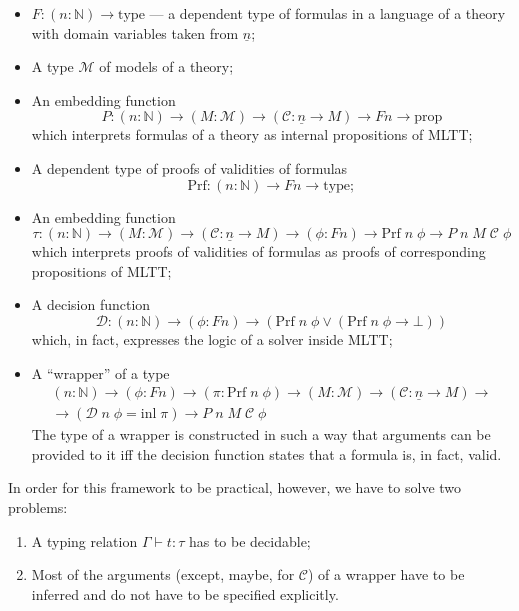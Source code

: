 \documentclass[manuscript,screen,review]{acmart}
\begin{document}
\begin{itemize}
  \item $F : (n : \mathbb{N}) \to \mathrm{type}$ --- a dependent type of
    formulas in a language of a theory with domain variables taken from
    $\underline{n}$;
  \item A type $\mathcal{M}$ of models of a theory;
  \item An embedding function
    \[
      P : (n : \mathbb{N}) \to (M : \mathcal{M})
          \to (\mathcal{C} : \underline{n} \to M) \to F n \to \mathrm{prop}
    \]
    which interprets formulas of a theory as internal propositions of MLTT;
  \item A dependent type of proofs of validities of formulas
    \[
      \mathrm{Prf} : (n : \mathbb{N}) \to F n \to \mathrm{type};
    \]
  \item An embedding function
    \[
      \tau : (n : \mathbb{N}) \to (M : \mathcal{M})
          \to (\mathcal{C} : \underline{n} \to M) \to (\phi : F n)
          \to \mathrm{Prf} \; n \; \phi \to P \; n \; M \; \mathcal{C} \; \phi
    \]
    which interprets proofs of validities of formulas as proofs of corresponding
    propositions of MLTT;
  \item A decision function
    \[
      \mathcal{D} : (n : \mathbb{N}) \to (\phi : F n)
          \to \left(
            \mathrm{Prf} \; n \; \phi \lor (\mathrm{Prf} \; n \; \phi \to \bot)
          \right)
    \]
    which, in fact, expresses the logic of a solver inside MLTT;
  \item A ``wrapper'' of a type
    \begin{multline*}
      (n : \mathbb{N}) \to (\phi : F n) \to (\pi : \mathrm{Prf} \; n \; \phi)
          \to (M : \mathcal{M}) \to (\mathcal{C} : \underline{n} \to M) \to\\\to
          (\mathcal{D} \; n \; \phi = \mathrm{inl} \; \pi)
          \to P \; n \; M \; \mathcal{C} \; \phi
    \end{multline*}
    The type of a wrapper is constructed in such a way that arguments can be
    provided to it iff the decision function states that a formula is, in fact,
    valid.
\end{itemize}

In order for this framework to be practical, however, we have to solve two
problems:

\begin{enumerate}
  \item A typing relation $\Gamma \vdash t : \tau$ has to be decidable;
  \item Most of the arguments (except, maybe, for $\mathcal{C}$) of a wrapper
    have to be inferred and do not have to be specified explicitly.
\end{enumerate}
\end{document}
